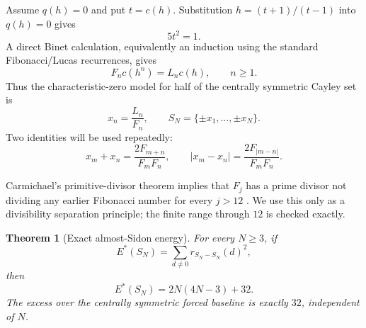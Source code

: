 \documentclass[11pt]{article}
\newtheorem{theorem}{Theorem}[section]
\begin{document}
Assume $q(h)=0$ and put $t=c(h)$.  Substitution
$h=(t+1)/(t-1)$ into $q(h)=0$ gives
\begin{equation}\label{eq:tquad}
5t^2=1.
\end{equation}
A direct Binet calculation, equivalently an induction using the standard
Fibonacci/Lucas recurrences, gives
\begin{equation}\label{eq:ratio}
F_n c(h^n)=L_n c(h),\qquad n\ge1.
\end{equation}
Thus the characteristic-zero model for half of the centrally symmetric Cayley
set is
\[
x_n=\frac{L_n}{F_n},\qquad
S_N=\{\pm x_1,\ldots,\pm x_N\}.
\]
Two identities will be used repeatedly:
\begin{equation}\label{eq:sumdiff}
x_m+x_n=\frac{2F_{m+n}}{F_mF_n},
\qquad
|x_m-x_n|=\frac{2F_{|m-n|}}{F_mF_n}.
\end{equation}

Carmichael's primitive-divisor theorem implies that $F_j$ has a prime divisor
not dividing any earlier Fibonacci number for every $j>12$
\cite{Carmichael1913,Yabuta2001}.  We use this only as a divisibility
separation principle; the finite range through $12$ is checked exactly.

\begin{theorem}[Exact almost-Sidon energy]\label{thm:almost-sidon}
For every $N\ge3$, if
\[
E^*(S_N)=\sum_{d\ne0}r_{S_N-S_N}(d)^2,
\]
then
\begin{equation}\label{eq:almost-sidon}
E^*(S_N)=2N(4N-3)+32.
\end{equation}
The excess over the centrally symmetric forced baseline is exactly $32$,
independent of $N$.
\end{theorem}
\end{document}
